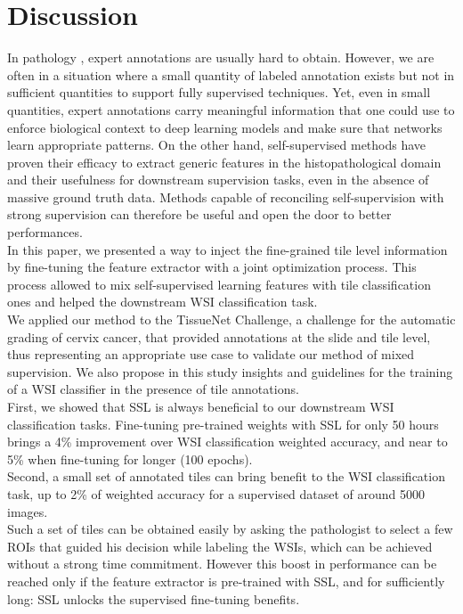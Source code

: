 \section{Discussion}

In pathology , expert annotations are usually hard to obtain. However, we are often in a situation where a small quantity of labeled annotation exists but not in sufficient quantities to support  fully supervised techniques. Yet, even in small quantities, expert annotations carry meaningful information that one could use to enforce biological context to deep learning models and make sure that networks learn appropriate patterns. On the other hand, self-supervised methods have proven their efficacy to extract generic features in the histopathological domain and their usefulness for downstream supervision tasks, even in the absence of massive ground truth data. Methods capable of reconciling self-supervision with strong supervision can therefore be useful and open the door to better performances. \\

In this paper, we presented a way to inject the fine-grained tile level information by fine-tuning the feature extractor with a joint optimization process. This process allowed to mix self-supervised learning features with tile classification ones and helped the downstream WSI classification task.  \\

We applied our method to the TissueNet Challenge, a challenge for the automatic grading of cervix cancer, that provided annotations at the slide and tile level, thus representing an appropriate use case to validate our method of mixed supervision. We also propose in this study insights and guidelines for the training of a WSI classifier in the presence of tile annotations. \\

First, we showed that SSL is always beneficial to our downstream WSI classification tasks. Fine-tuning pre-trained weights with SSL for only 50 hours brings a 4\% improvement over WSI classification weighted accuracy, and near to 5\% when fine-tuning for longer (100 epochs). \\

Second, a small set of annotated tiles can bring benefit to the WSI classification task, up to 2\% of weighted accuracy for a supervised dataset of around 5000 images. \\
Such a set of tiles can be obtained easily by asking the pathologist to select a few ROIs that guided his decision while labeling the WSIs, which can be achieved without a strong time commitment.
However this boost in performance can be reached only if the feature extractor is pre-trained with SSL, and for sufficiently long: SSL unlocks the supervised fine-tuning benefits.\\

